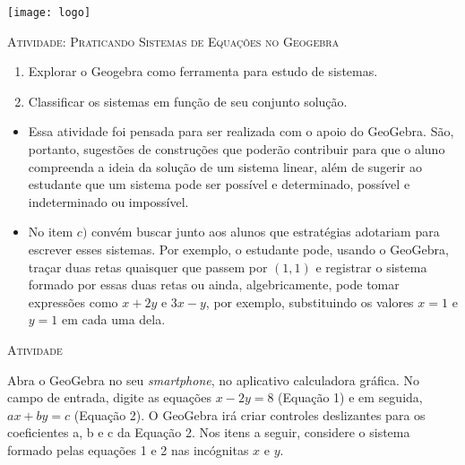 \documentclass[10 pt,usenames,dvipsnames, oneside]{article}
\begin{document}
\begin{center}
  \begin{minipage}[l]{3cm}
\texttt{[image: logo]}    
\end{minipage}\hfill
\begin{minipage}[r]{.8\textwidth}
 {\Large \scshape Atividade: Praticando Sistemas de Equações no Geogebra}  
\end{minipage}
\end{center}
\vspace{.2cm}

\ifdefined\prof

\begin{goals}
\begin{enumerate}
\item Explorar o Geogebra como ferramenta para estudo de sistemas.
\item Classificar os sistemas em função de seu conjunto solução. 
\end{enumerate}

\tcblower

\begin{itemize}
\item Essa atividade foi pensada para ser realizada com o apoio do GeoGebra. São, portanto, sugestões de construções que poderão contribuir para que o aluno compreenda a ideia da solução de um sistema linear, além de sugerir ao estudante que  um sistema pode ser possível e determinado, possível e indeterminado ou impossível.
\item No item $c)$ convém buscar junto aos alunos que estratégias adotariam para escrever esses sistemas. Por exemplo, o estudante pode, usando o GeoGebra, traçar duas retas quaisquer que passem por $(1,1)$ e registrar o sistema formado por essas duas retas ou ainda, algebricamente, pode tomar expressões como $x + 2y$ e $3x-y$, por exemplo, substituindo os valores $x=1$ e $y=1$ em cada uma dela.
\end{itemize}
\end{goals}

\bigskip
\begin{center}
{\large \scshape Atividade}
\end{center}
\fi

Abra o GeoGebra no seu \emph{smartphone}, no aplicativo calculadora gráfica. No campo de entrada, digite as equações $x - 2y = 8$ (Equação 1) e em seguida, $ax+ by = c$ (Equação 2). O GeoGebra irá criar controles deslizantes para os coeficientes a, b e c da Equação 2. Nos itens a seguir, considere o sistema formado pelas equações 1 e 2 nas incógnitas $x$ e $y$.
\end{document}
